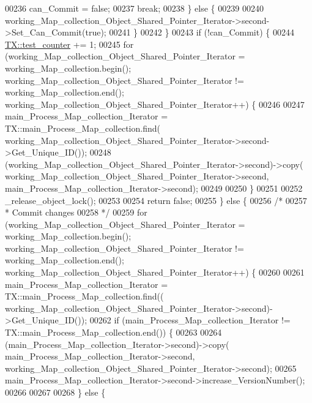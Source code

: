 \begin{DoxyCode}
00236             can\_Commit = \textcolor{keyword}{false};
00237             \textcolor{keywordflow}{break};
00238         \} \textcolor{keywordflow}{else} \{
00239 
00240             working\_Map\_collection\_Object\_Shared\_Pointer\_Iterator->second->Set\_Can\_Commit(\textcolor{keyword}{true});
00241         \}
00242     \}
00243     \textcolor{keywordflow}{if} (!can\_Commit) \{
00244         \hyperlink{class_t_x_a25838234aab99ae891a90eb8623a8b3c}{TX::test\_counter} += 1;
00245         \textcolor{keywordflow}{for} (working\_Map\_collection\_Object\_Shared\_Pointer\_Iterator = working\_Map\_collection.begin(); 
      working\_Map\_collection\_Object\_Shared\_Pointer\_Iterator != working\_Map\_collection.end(); 
      working\_Map\_collection\_Object\_Shared\_Pointer\_Iterator++) \{
00246           
00247             main\_Process\_Map\_collection\_Iterator  = TX::main\_Process\_Map\_collection.find(
      working\_Map\_collection\_Object\_Shared\_Pointer\_Iterator->second->Get\_Unique\_ID());
00248             (working\_Map\_collection\_Object\_Shared\_Pointer\_Iterator->second)->copy(
      working\_Map\_collection\_Object\_Shared\_Pointer\_Iterator->second, main\_Process\_Map\_collection\_Iterator->second);
00249 
00250         \}
00251         
00252         \_release\_object\_lock();
00253 
00254         \textcolor{keywordflow}{return} \textcolor{keyword}{false};
00255     \} \textcolor{keywordflow}{else} \{
00256         \textcolor{comment}{/*}
00257 \textcolor{comment}{         * Commit changes}
00258 \textcolor{comment}{         */}
00259         \textcolor{keywordflow}{for} (working\_Map\_collection\_Object\_Shared\_Pointer\_Iterator = working\_Map\_collection.begin(); 
      working\_Map\_collection\_Object\_Shared\_Pointer\_Iterator != working\_Map\_collection.end(); 
      working\_Map\_collection\_Object\_Shared\_Pointer\_Iterator++) \{
00260             
00261                 main\_Process\_Map\_collection\_Iterator = TX::main\_Process\_Map\_collection.find((
      working\_Map\_collection\_Object\_Shared\_Pointer\_Iterator->second)->Get\_Unique\_ID());
00262                 \textcolor{keywordflow}{if} (main\_Process\_Map\_collection\_Iterator != TX::main\_Process\_Map\_collection.end()) \{
00263 
00264                     (main\_Process\_Map\_collection\_Iterator->second)->copy(
      main\_Process\_Map\_collection\_Iterator->second, working\_Map\_collection\_Object\_Shared\_Pointer\_Iterator->second);
00265                     main\_Process\_Map\_collection\_Iterator->second->increase\_VersionNumber();
00266 
00267 
00268                 \} \textcolor{keywordflow}{else} \{

\end{DoxyCode}
